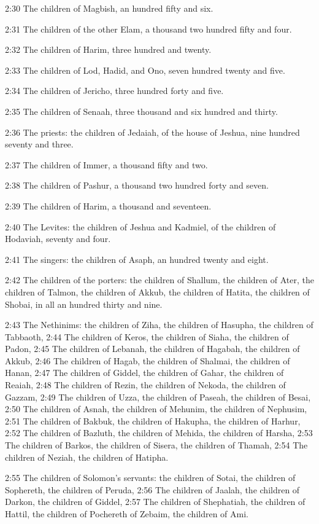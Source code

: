 2:30 The children of Magbish, an hundred fifty and six.

2:31 The children of the other Elam, a thousand two hundred fifty and four.

2:32 The children of Harim, three hundred and twenty.

2:33 The children of Lod, Hadid, and Ono, seven hundred twenty and five.

2:34 The children of Jericho, three hundred forty and five.

2:35 The children of Senaah, three thousand and six hundred and thirty.

2:36 The priests: the children of Jedaiah, of the house of Jeshua, nine hundred seventy and three.

2:37 The children of Immer, a thousand fifty and two.

2:38 The children of Pashur, a thousand two hundred forty and seven.

2:39 The children of Harim, a thousand and seventeen.

2:40 The Levites: the children of Jeshua and Kadmiel, of the children of Hodaviah, seventy and four.

2:41 The singers: the children of Asaph, an hundred twenty and eight.

2:42 The children of the porters: the children of Shallum, the children of Ater, the children of Talmon, the children of Akkub, the children of Hatita, the children of Shobai, in all an hundred thirty and nine.

2:43 The Nethinims: the children of Ziha, the children of Hasupha, the children of Tabbaoth, 2:44 The children of Keros, the children of Siaha, the children of Padon, 2:45 The children of Lebanah, the children of Hagabah, the children of Akkub, 2:46 The children of Hagab, the children of Shalmai, the children of Hanan, 2:47 The children of Giddel, the children of Gahar, the children of Reaiah, 2:48 The children of Rezin, the children of Nekoda, the children of Gazzam, 2:49 The children of Uzza, the children of Paseah, the children of Besai, 2:50 The children of Asnah, the children of Mehunim, the children of Nephusim, 2:51 The children of Bakbuk, the children of Hakupha, the children of Harhur, 2:52 The children of Bazluth, the children of Mehida, the children of Harsha, 2:53 The children of Barkos, the children of Sisera, the children of Thamah, 2:54 The children of Neziah, the children of Hatipha.

2:55 The children of Solomon's servants: the children of Sotai, the children of Sophereth, the children of Peruda, 2:56 The children of Jaalah, the children of Darkon, the children of Giddel, 2:57 The children of Shephatiah, the children of Hattil, the children of Pochereth of Zebaim, the children of Ami.

